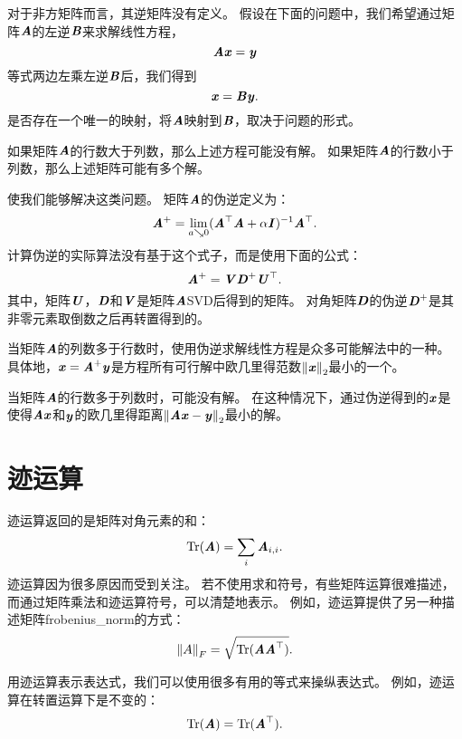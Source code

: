 对于非方矩阵而言，其逆矩阵没有定义。
假设在下面的问题中，我们希望通过矩阵$\MA$的左逆$\MB$来求解线性方程，
\begin{equation}
    \MA\Vx=\Vy
\end{equation}
等式两边左乘左逆$\MB$后，我们得到
\begin{equation}
    \Vx=\MB\Vy.
\end{equation}
是否存在一个唯一的映射，将$\MA$映射到$\MB$，取决于问题的形式。


如果矩阵$\MA$的行数大于列数，那么上述方程可能没有解。
如果矩阵$\MA$的行数小于列数，那么上述矩阵可能有多个解。


使我们能够解决这类问题。
矩阵$\MA$的伪逆定义为：
\begin{equation}
    \MA^+ = \lim_{a \searrow 0} (\MA^\top\MA + \alpha \MI)^{-1} \MA^\top.
\end{equation}
计算伪逆的实际算法没有基于这个式子，而是使用下面的公式：
\begin{equation}
    \MA^+ = \MV\MD^+\MU^\top.
\end{equation}
其中，矩阵$\MU$，$\MD$和$\MV$是矩阵$\MA$\gls{SVD}后得到的矩阵。
对角矩阵$\MD$的伪逆$\MD^+$是其非零元素取倒数之后再转置得到的。


当矩阵$\MA$的列数多于行数时，使用伪逆求解线性方程是众多可能解法中的一种。
具体地，$\Vx=\MA^+\Vy$是方程所有可行解中欧几里得范数$\norm{\Vx}_2$最小的一个。


当矩阵$\MA$的行数多于列数时，可能没有解。
在这种情况下，通过伪逆得到的$\Vx$是使得$\MA\Vx$和$\Vy$的欧几里得距离$\norm{\MA\Vx-\Vy}_2$最小的解。




\section{迹运算}
\label{sec:the_trace_operator}

迹运算返回的是矩阵对角元素的和：
\begin{equation}
    \Tr(\MA)= \sum_i \MA_{i,i}.
\end{equation}
迹运算因为很多原因而受到关注。
若不使用求和符号，有些矩阵运算很难描述，而通过矩阵乘法和迹运算符号，可以清楚地表示。
例如，迹运算提供了另一种描述矩阵\gls{frobenius_norm}的方式：
\begin{equation}
\label{eq:2.49}
    \norm{A}_F = \sqrt{\text{Tr}(\MA \MA^\top)}.
\end{equation}


用迹运算表示表达式，我们可以使用很多有用的等式来操纵表达式。
例如，迹运算在转置运算下是不变的：
\begin{equation}
    \Tr(\MA)=\Tr(\MA^\top).
\end{equation}


